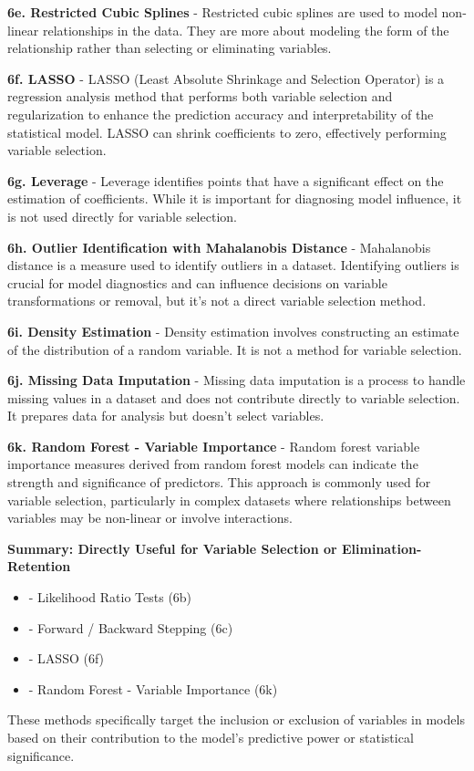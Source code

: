 \documentclass{article}
\begin{document}
\textbf{6e. Restricted Cubic Splines}
- Restricted cubic splines are used to model non-linear relationships in the data. They are more about modeling the form of the relationship rather than selecting or eliminating variables.

\textbf{6f. LASSO}
- LASSO (Least Absolute Shrinkage and Selection Operator) is a regression analysis method that performs both variable selection and regularization to enhance the prediction accuracy and interpretability of the statistical model. LASSO can shrink coefficients to zero, effectively performing variable selection.

\textbf{6g. Leverage}
- Leverage identifies points that have a significant effect on the estimation of coefficients. While it is important for diagnosing model influence, it is not used directly for variable selection.

\textbf{6h. Outlier Identification with Mahalanobis Distance}
- Mahalanobis distance is a measure used to identify outliers in a dataset. Identifying outliers is crucial for model diagnostics and can influence decisions on variable transformations or removal, but it's not a direct variable selection method.

\textbf{6i. Density Estimation}
- Density estimation involves constructing an estimate of the distribution of a random variable. It is not a method for variable selection.

\textbf{ 6j. Missing Data Imputation}
- Missing data imputation is a process to handle missing values in a dataset and does not contribute directly to variable selection. It prepares data for analysis but doesn't select variables.

\textbf{6k. Random Forest - Variable Importance}
- Random forest variable importance measures derived from random forest models can indicate the strength and significance of predictors. This approach is commonly used for variable selection, particularly in complex datasets where relationships between variables may be non-linear or involve interactions.

\textbf{Summary: Directly Useful for Variable Selection or Elimination-Retention}
\begin{itemize}
    \item - Likelihood Ratio Tests (6b)
    \item - Forward / Backward Stepping (6c)
    \item - LASSO (6f)
    \item - Random Forest - Variable Importance (6k)
\end{itemize}

These methods specifically target the inclusion or exclusion of variables in models based on their contribution to the model's predictive power or statistical significance.
\end{document}
